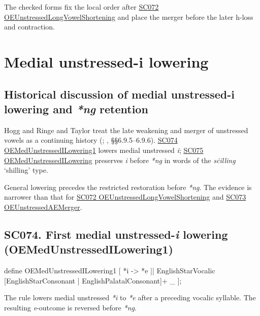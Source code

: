 \documentclass[
  british,
  a4paper,
  openany]{book}
\providecommand{\texorpdfstring}[2]{#1}
\DeclareRobustCommand{\CAPRRuleHeading}[2]{%
  #1\texorpdfstring{\\(#2)}{ (#2)}%
}
\begin{document}
The checked forms fix the local order after
\hyperref[rule-OEUnstressedLongVowelShortening]{SC072
OEUnstressedLongVowelShortening} and place the merger before the later
h-loss and contraction.

\newpage

\section{Medial unstressed-i
lowering}\label{medial-unstressed-i-lowering}

\subsection{\texorpdfstring{Historical discussion of medial unstressed-i
lowering and \emph{*ng}
retention}{Historical discussion of medial unstressed-i lowering and  retention}}\label{historical-discussion-of-medial-unstressed-i-lowering-and-retention}

Hogg and Ringe and Taylor treat the late weakening and merger of
unstressed vowels as a continuing history (; , §§6.9.5--6.9.6).
\hyperref[rule-OEMedUnstressedILowering1]{SC074
OEMedUnstressedILowering1} lowers medial unstressed \emph{i};
\hyperref[rule-OEMedUnstressedILowering]{SC075 OEMedUnstressedILowering}
preserves \emph{i} before \emph{*ng} in words of the \emph{sċilling}
`shilling' type.

General lowering precedes the restricted restoration before \emph{*ng}.
The evidence is narrower than that for
\hyperref[rule-OEUnstressedLongVowelShortening]{SC072
OEUnstressedLongVowelShortening} and
\hyperref[rule-OEUnstressedAEMerger]{SC073 OEUnstressedAEMerger}.

\subsection{\texorpdfstring{\CAPRRuleHeading{SC074. First medial unstressed-\emph{i} lowering}{OEMedUnstressedILowering1}}{}}\label{rule-OEMedUnstressedILowering1}

\begin{ReaderFacingFoma}
define OEMedUnstressedILowering1 [
    {*i} -> {*e} || EnglishStarVocalic [EnglishStarConsonant | EnglishPalatalConsonant]+ _
];
\end{ReaderFacingFoma}

The rule lowers medial unstressed \emph{*i} to \emph{*e} after a
preceding vocalic syllable. The resulting \emph{e}-outcome is reversed
before \emph{*ng}.
\end{document}
